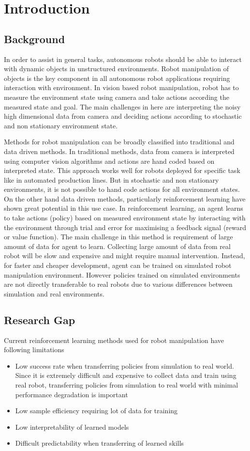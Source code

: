 \chapter{Introduction}

\section{Background}
In order to assist in general tasks, autonomous robots should be able to interact with dynamic objects in unstructured environments. Robot manipulation of objects is the key component in all autonomous robot applications requiring interaction with environment. In vision based robot manipulation, robot has to measure the environment state using camera and take actions according the measured state and goal. The main challenges in here are interpreting the noisy high dimensional data from camera and deciding actions according to stochastic and non stationary environment state.

Methods for robot manipulation can be broadly classified into traditional and data driven methods. In traditional methods, data from camera is interpreted using computer vision algorithms and actions are hand coded based on interpreted state. This approach works well for robots deployed for specific task like in automated production lines. But in stochastic and non stationary environments, it is not possible to hand code actions for all environment states. On the other hand data driven methods, particularly reinforcement learning have shown great potential in this use case. In reinforcement learning, an agent learns to take actions (policy) based on measured environment state by interacting with the environment through trial and error for maximising a feedback signal (reward or value function). The main challenge in this method is requirement of large amount of data for agent to learn. Collecting large amount of data from real robot will be slow and expensive and might require manual intervention. Instead, for faster and cheaper development, agent can be trained on simulated robot manipulation environment. However policies trained on simulated environments are not directly transferable to real robots due to various differences between simulation and real environments.

\section{Research Gap}
Current reinforcement learning methods used for robot manipulation have following limitations
\begin{itemize}
	\item Low success rate when transferring policies from simulation to real world. Since it is extremely difficult and expensive to collect data and train using real robot, transferring policies from simulation to real world with minimal performance degradation is important
	\item Low sample efficiency requiring lot of data for training
	\item Low interpretability of learned models
	\item Difficult predictability when transferring of learned skills
\end{itemize}

